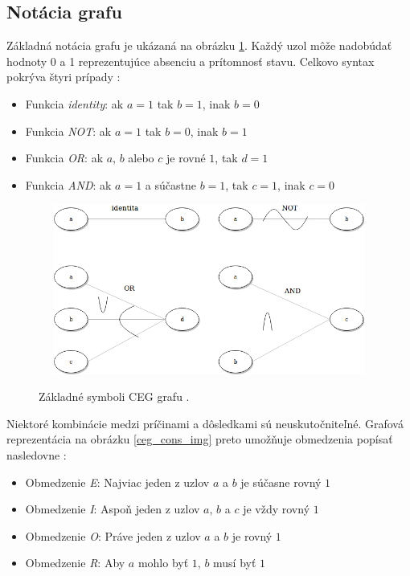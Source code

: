 \subsection*{Notácia grafu}
Základná notácia grafu je ukázaná na obrázku \ref{ceg_img}. Každý uzol môže nadobúdať hodnoty 0 a 1 reprezentujúce absenciu a prítomnosť stavu. Celkovo syntax pokrýva štyri prípady \cite{Ast}: 
\begin{itemize}
	\item{Funkcia \textit{identity}: ak \(a = 1\) tak \(b = 1\), inak \(b = 0\) 
	}
	\item{Funkcia \textit{NOT}: ak \(a = 1\) tak \(b = 0\), inak \(b = 1\) 
	}
	\item{Funkcia \textit{OR}: ak \(a\), \(b\) alebo \(c\) je rovné \(1\), tak \(d = 1\) 
	} 		
	\item{Funkcia \textit{AND}: ak \(a = 1\) a súčastne \(b = 1\), tak \(c = 1\), inak \(c = 0\)  
	} 
\end{itemize}
\begin{figure}[h]\centering
	\centering
	\includegraphics[width=4.5in,height=2.2in]{obrazky-figures/ceg.png}\\[1pt]
	\caption{Základné symboli CEG grafu \cite{Ast}.}
	\label{ceg_img}
\end{figure}
Niektoré kombinácie medzi príčinami a dôsledkami sú neuskutočniteľné. Grafová reprezentácia na obrázku \ref{ceg_cons_img} preto umožňuje obmedzenia popísať nasledovne \cite{Ast}:
\begin{itemize}
	\item{Obmedzenie \textit{E}: Najviac jeden z uzlov \(a\) a \(b\) je súčasne rovný \(1\) 
	}
	\item{Obmedzenie \textit{I}: Aspoň jeden z uzlov \(a\), \(b\) a \(c\) je vždy rovný \(1\) 
	}
	\item{Obmedzenie \textit{O}: Práve jeden z uzlov \(a\) a \(b\) je  rovný \(1\) 
	} 		
	\item{Obmedzenie \textit{R}: Aby \(a\) mohlo byť \(1\), \(b\) musí byť \(1\) 
	}
\end{itemize}    

